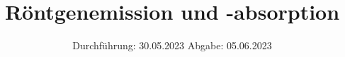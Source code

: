 

\subject{V602}
\title{Röntgenemission und -absorption}
\date{%
  Durchführung: 30.05.2023
  \hspace{3em}
  Abgabe: 05.06.2023
}



\maketitle
\thispagestyle{empty}
\tableofcontents
\newpage






\printbibliography{}


